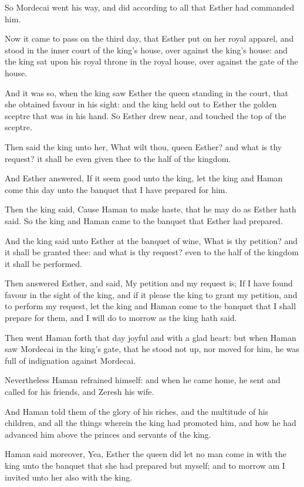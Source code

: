 \Verse So Mordecai went his way, and did according to all that Esther had commanded him.


\Chapter
\Verse Now it came to pass on the third day, that Esther put on her royal apparel, and stood in the inner court of the king's house, over against the king's house: and the king sat upon his royal throne in the royal house, over against the gate of the house.

\Verse And it was so, when the king saw Esther the queen standing in the court, that she obtained favour in his sight: and the king held out to Esther the golden sceptre that was in his hand. So Esther drew near, and touched the top of the sceptre.

\Verse Then said the king unto her, What wilt thou, queen Esther? and what is thy request? it shall be even given thee to the half of the kingdom.

\Verse And Esther answered, If it seem good unto the king, let the king and Haman come this day unto the banquet that I have prepared for him.

\Verse Then the king said, Cause Haman to make haste, that he may do as Esther hath said. So the king and Haman came to the banquet that Esther had prepared.

\Verse And the king said unto Esther at the banquet of wine, What is thy petition? and it shall be granted thee: and what is thy request? even to the half of the kingdom it shall be performed.

\Verse Then answered Esther, and said, My petition and my request is; \Verse If I have found favour in the sight of the king, and if it please the king to grant my petition, and to perform my request, let the king and Haman come to the banquet that I shall prepare for them, and I will do to morrow as the king hath said.

\Verse Then went Haman forth that day joyful and with a glad heart: but when Haman saw Mordecai in the king's gate, that he stood not up, nor moved for him, he was full of indignation against Mordecai.

\Verse Nevertheless Haman refrained himself: and when he came home, he sent and called for his friends, and Zeresh his wife.

\Verse And Haman told them of the glory of his riches, and the multitude of his children, and all the things wherein the king had promoted him, and how he had advanced him above the princes and servants of the king.

\Verse Haman said moreover, Yea, Esther the queen did let no man come in with the king unto the banquet that she had prepared but myself; and to morrow am I invited unto her also with the king.

